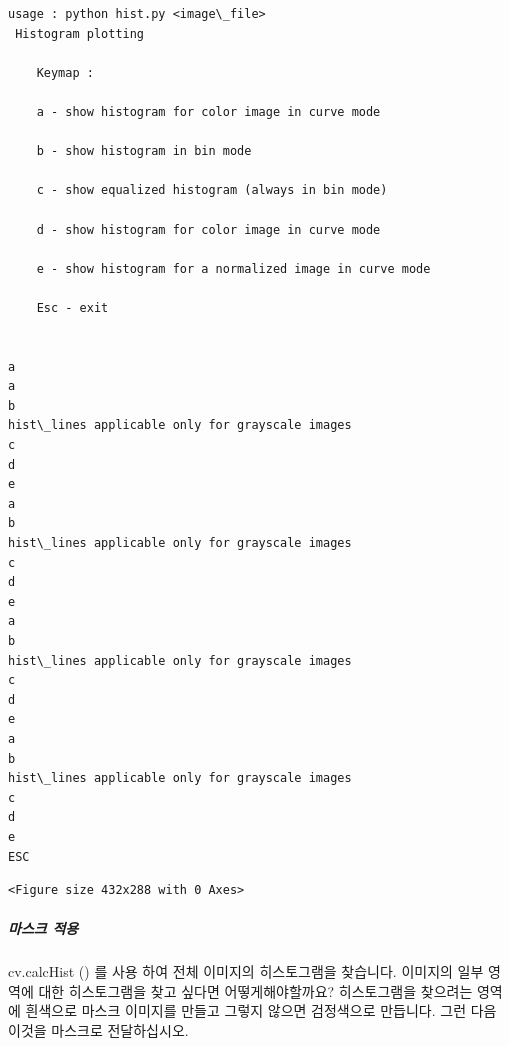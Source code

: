 \documentclass[11pt]{article}
\begin{document}
    \begin{Verbatim}[commandchars=\\\{\}]
usage : python hist.py <image\_file>
 Histogram plotting 

    Keymap :

    a - show histogram for color image in curve mode 

    b - show histogram in bin mode 

    c - show equalized histogram (always in bin mode) 

    d - show histogram for color image in curve mode 

    e - show histogram for a normalized image in curve mode 

    Esc - exit 

    
a
a
b
hist\_lines applicable only for grayscale images
c
d
e
a
b
hist\_lines applicable only for grayscale images
c
d
e
a
b
hist\_lines applicable only for grayscale images
c
d
e
a
b
hist\_lines applicable only for grayscale images
c
d
e
ESC

    \end{Verbatim}

    
    \begin{verbatim}
<Figure size 432x288 with 0 Axes>
    \end{verbatim}

    
    \hypertarget{uxb9c8uxc2a4uxd06c-uxc801uxc6a9}{%
\subparagraph{마스크 적용}\label{uxb9c8uxc2a4uxd06c-uxc801uxc6a9}}

cv.calcHist () 를 사용 하여 전체 이미지의 히스토그램을 찾습니다.
이미지의 일부 영역에 대한 히스토그램을 찾고 싶다면 어떻게해야할까요?
히스토그램을 찾으려는 영역에 흰색으로 마스크 이미지를 만들고 그렇지
않으면 검정색으로 만듭니다. 그런 다음 이것을 마스크로 전달하십시오.
\end{document}
